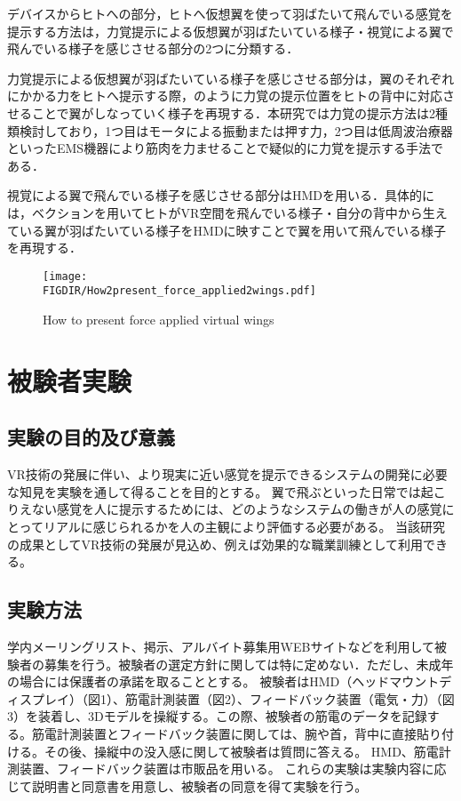 \begin{small}
  デバイスからヒトへの部分，ヒトへ仮想翼を使って羽ばたいて飛んでいる感覚を提示する方法は，力覚提示による仮想翼が羽ばたいている様子・視覚による翼で飛んでいる様子を感じさせる部分の2つに分類する．
  
  力覚提示による仮想翼が羽ばたいている様子を感じさせる部分は，翼のそれぞれにかかる力をヒトへ提示する際，のように力覚の提示位置をヒトの背中に対応させることで翼がしなっていく様子を再現する．本研究では力覚の提示方法は2種類検討しており，1つ目はモータによる振動または押す力，2つ目は低周波治療器といったEMS機器により筋肉を力ませることで疑似的に力覚を提示する手法である．

  視覚による翼で飛んでいる様子を感じさせる部分はHMDを用いる．具体的には，ベクションを用いてヒトがVR空間を飛んでいる様子・自分の背中から生えている翼が羽ばたいている様子をHMDに映すことで翼を用いて飛んでいる様子を再現する．

  \begin{figure}[t]
    \begin{center}
      \texttt{[image: \\FIGDIR/How2present\_force\_applied2wings.pdf]}%
      \caption{How to present force applied virtual wings}
    \end{center}
  \end{figure}



\section{被験者実験}
  \subsection{実験の目的及び意義}
    VR技術の発展に伴い、より現実に近い感覚を提示できるシステムの開発に必要な知見を実験を通して得ることを目的とする。
    翼で飛ぶといった日常では起こりえない感覚を人に提示するためには、どのようなシステムの働きが人の感覚にとってリアルに感じられるかを人の主観により評価する必要がある。
    当該研究の成果としてVR技術の発展が見込め、例えば効果的な職業訓練として利用できる。
  
  \subsection{実験方法}
    学内メーリングリスト、掲示、アルバイト募集用WEBサイトなどを利用して被験者の募集を行う。被験者の選定方針に関しては特に定めない．ただし、未成年の場合には保護者の承諾を取ることとする。
    被験者はHMD（ヘッドマウントディスプレイ）（図1）、筋電計測装置（図2）、フィードバック装置（電気・力）（図3）を装着し、3Dモデルを操縦する。この際、被験者の筋電のデータを記録する。筋電計測装置とフィードバック装置に関しては、腕や首，背中に直接貼り付ける。その後、操縦中の没入感に関して被験者は質問に答える。
    HMD、筋電計測装置、フィードバック装置は市販品を用いる。
    これらの実験は実験内容に応じて説明書と同意書を用意し、被験者の同意を得て実験を行う。



\end{small}
